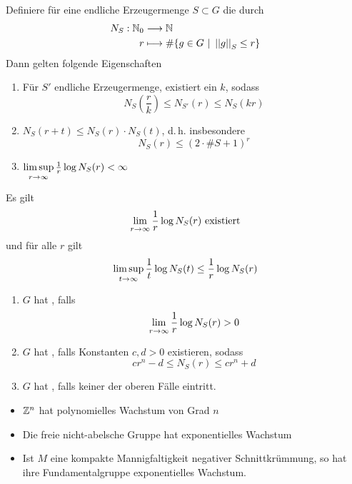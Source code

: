 \documentclass{book}
\begin{document}
\Def{}
Definiere für eine endliche Erzeugermenge $S \subset G$ die  durch
\begin{align*}
N_S : \mathbb{N}_0 &\overset{}{\longrightarrow} \mathbb{N}\\
r &\longmapsto \# \{g \in G~|~\left|\left|g\right|\right|_S \leq r\}
\end{align*}
Dann gelten folgende Eigenschaften
\begin{enumerate}[1.)]
\item Für $S'$ endliche Erzeugermenge, existiert ein $k$, sodass
\[ N_S(\frac{r}{k}) \leq N_{S'}(r) \leq N_S(kr) \]
\item $N_S(r +t) \leq N_S(r) \cdot N_S(t)$, d.\,h. insbesondere
\[ N_S(r) \leq (2\cdot \# S +1)^r \]
\item $\limsup\limits_{r\overset{}{\rightarrow}{\infty}} \frac{1}{r}\log N_S(r) < \infty $
\end{enumerate}

\Lem{}
Es gilt
\[ \lim\limits_{r\overset{}{\rightarrow} \infty} \frac{1}{r} \log N_S(r) \text{ existiert} \]
und für alle $r$ gilt
\[ \limsup\limits_{t\overset{}{\rightarrow}{\infty}} \frac{1}{t}\log N_S(t) \leq \frac{1}{r}\log N_S(r) \]

\Def{}
\begin{enumerate}[1.)]
\item $G$ hat , falls
\[ \lim\limits_{r\overset{}{\rightarrow} \infty} \frac{1}{r} \log N_S(r) > 0 \]
\item $G$ hat , falls Konstanten $c,d > 0$ existieren, sodass
\[ cr^n - d \leq N_S(r) \leq cr^n + d\]
\item $G$ hat , falls keiner der oberen Fälle eintritt.
\end{enumerate}

\Bsp{}
\begin{itemize}
\item $\mathbb{Z}^n$ hat polynomielles Wachstum von Grad $n$
\item Die freie nicht-abelsche Gruppe hat exponentielles Wachstum
\item Ist $M$ eine kompakte Mannigfaltigkeit negativer Schnittkrümmung, so hat ihre Fundamentalgruppe exponentielles Wachstum.
\end{itemize}
\end{document}
